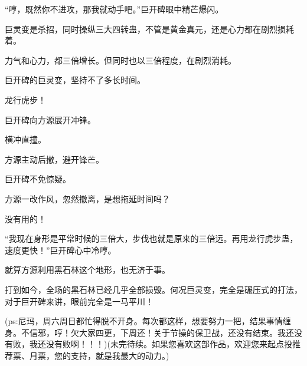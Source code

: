 \begin{this_body}
“哼，既然你不进攻，那我就动手吧。”巨开碑眼中精芒爆闪。

巨灵变是杀招，同时操纵三大四转蛊，不管是黄金真元，还是心力都在剧烈损耗着。

力气和心力，都三倍增长。但同时也以三倍程度，在剧烈消耗。

巨开碑的巨灵变，坚持不了多长时间。

龙行虎步！

巨开碑向方源展开冲锋。

横冲直撞。

方源主动后撤，避开锋芒。

巨开碑不免惊疑。

方源一改作风，忽然撤离，是想拖延时间吗？

没有用的！

“我现在身形是平常时候的三倍大，步伐也就是原来的三倍远。再用龙行虎步蛊，速度更快！”巨开碑心中冷哼。

就算方源利用黑石林这个地形，也无济于事。

打到如今，全场的黑石林已经几乎全部损毁。何况巨灵变，完全是碾压式的打法，对于巨开碑来讲，眼前完全是一马平川！

(ps:尼玛，周六周日都忙得脱不开身。每次都这样，想要努力一把，结果事情缠身。不信邪，哼！欠大家四更，下周还！关于节操的保卫战，还没有结束。我还没有败，我还没有败啊！！！)(未完待续。如果您喜欢这部作品，欢迎您来起点投推荐票、月票，您的支持，就是我最大的动力。)

\end{this_body}

